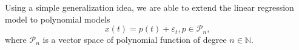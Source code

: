 
 Using a simple generalization idea, we are able to extend the linear regression model to polynomial models
 \begin{displaymath}
  x(t) = p(t) + \varepsilon_t, p \in \mathcal{P}_n,
 \end{displaymath}
 where $\mathcal{P}_n$ is a vector space of polynomial function of degree $n \in \mathbb{N}$.

